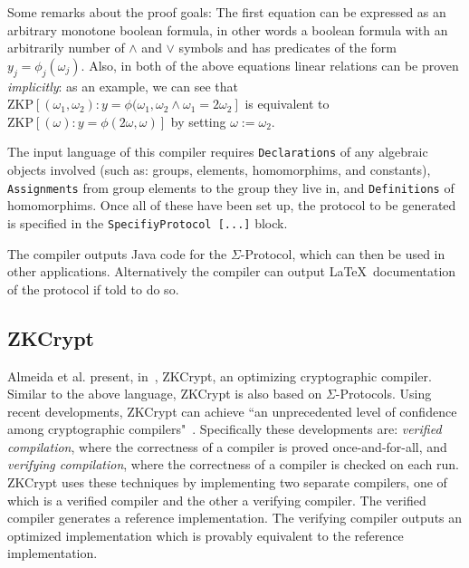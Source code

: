\documentclass{sig-alternate}
\begin{document}
		Some remarks about the proof goals: The first equation can be expressed
		as an arbitrary monotone boolean formula, in other words a boolean formula
		with an arbitrarily number of $\land$ and $\lor$ symbols and has predicates of
		the form $y_{j} = \phi_{j}(\omega_{j}).$ Also, in both of the above equations
		linear relations can be proven \textit{implicitly}: as an example, we can
		see that $\text{ZKP}[(\omega_{1},\omega_{2}):y = \phi(\omega_{1},\omega_{2} \land \omega_{1} = 2\omega_{2}]$
		is equivalent to $\text{ZKP}[(\omega):y = \phi(2\omega,\omega)]$ by setting $\omega:=\omega_{2}$.
		
		The input language of this compiler requires \texttt{Declarations} of any
		algebraic objects involved (such as: groups, elements, homomorphims, and
		constants), \texttt{Assignments} from group elements to the group
		they live in, and \texttt{Definitions} of homomorphims. Once all of these
		have been set up, the protocol to be generated is specified in the
		\texttt{SpecifiyProtocol [...]} block.
		
		The compiler outputs Java code for the $\Sigma$-Protocol, which
		can then be used in other applications. Alternatively the compiler
		can output \LaTeX~documentation of the protocol if told to do so.
		
	\subsection{ZKCrypt}
		Almeida et al. present, in~\cite{ZKCrypt:2012}, ZKCrypt, an optimizing cryptographic
		compiler. Similar to the above language, ZKCrypt is also based on $\Sigma$-Protocols.
		Using recent developments, ZKCrypt can achieve ``an unprecedented level of confidence
		among cryptographic compilers"~\cite{ZKCrypt:2012}. Specifically these developments are:
		\textit{verified compilation}, where the correctness of a compiler is proved once-and-for-all,
		and \textit{verifying compilation}, where the correctness of a compiler is checked on
		each run. ZKCrypt uses these techniques by implementing two separate compilers, one of which
		is a verified compiler and the other a verifying compiler. The verified compiler generates
		a reference implementation. The verifying compiler outputs an optimized implementation
		which is provably equivalent to the reference implementation. 
		
\end{document}
